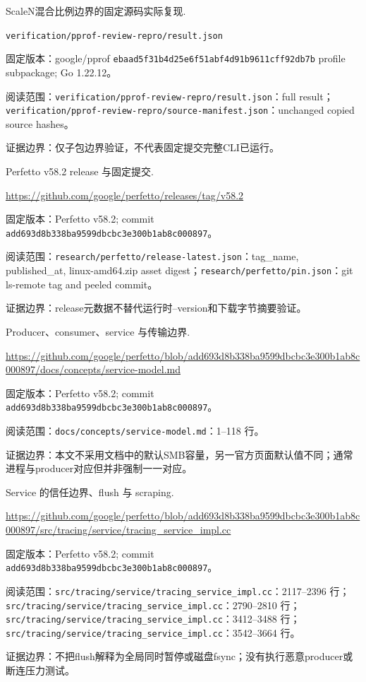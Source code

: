 \documentclass[UTF8,fontset=fandol,openany,11pt]{ctexbook}
\begin{document}
\begin{thebibliography}{999}
 ScaleN混合比例边界的固定源码实际复现.\par
\nolinkurl{verification/pprof-review-repro/result.json}\par
{\small\raggedright 固定版本：google/pprof \texttt{ebaad5f3\allowbreak{}1b4d25e6\allowbreak{}f51abf4d\allowbreak{}91b9611c\allowbreak{}ff92db7b} profile subpackage; Go 1.22.12。\par
阅读范围：\nolinkurl{verification/pprof-review-repro/result.json}：full result；\nolinkurl{verification/pprof-review-repro/source-manifest.json}：unchanged copied source hashes。\par
证据边界：仅子包边界验证，不代表固定提交完整CLI已运行。
}

 Perfetto v58.2 release 与固定提交.\par
\url{https://github.com/google/perfetto/releases/tag/v58.2}\par
{\small\raggedright 固定版本：Perfetto v58.2; commit \texttt{add693d8\allowbreak{}b338ba95\allowbreak{}99dbcbc3\allowbreak{}e300b1ab\allowbreak{}8c000897}。\par
阅读范围：\nolinkurl{research/perfetto/release-latest.json}：tag\_name, published\_at, linux-amd64.zip asset digest；\nolinkurl{research/perfetto/pin.json}：git ls-remote tag and peeled commit。\par
证据边界：release元数据不替代运行时--version和下载字节摘要验证。
}

 Producer、consumer、service 与传输边界.\par
\url{https://github.com/google/perfetto/blob/add693d8b338ba9599dbcbc3e300b1ab8c000897/docs/concepts/service-model.md}\par
{\small\raggedright 固定版本：Perfetto v58.2; commit \texttt{add693d8\allowbreak{}b338ba95\allowbreak{}99dbcbc3\allowbreak{}e300b1ab\allowbreak{}8c000897}。\par
阅读范围：\nolinkurl{docs/concepts/service-model.md}：1–118 行。\par
证据边界：本文不采用文档中的默认SMB容量，另一官方页面默认值不同；通常进程与producer对应但并非强制一一对应。
}

 Service 的信任边界、flush 与 scraping.\par
\url{https://github.com/google/perfetto/blob/add693d8b338ba9599dbcbc3e300b1ab8c000897/src/tracing/service/tracing_service_impl.cc}\par
{\small\raggedright 固定版本：Perfetto v58.2; commit \texttt{add693d8\allowbreak{}b338ba95\allowbreak{}99dbcbc3\allowbreak{}e300b1ab\allowbreak{}8c000897}。\par
阅读范围：\nolinkurl{src/tracing/service/tracing_service_impl.cc}：2117–2396 行；\nolinkurl{src/tracing/service/tracing_service_impl.cc}：2790–2810 行；\nolinkurl{src/tracing/service/tracing_service_impl.cc}：3412–3488 行；\nolinkurl{src/tracing/service/tracing_service_impl.cc}：3542–3664 行。\par
证据边界：不把flush解释为全局同时暂停或磁盘fsync；没有执行恶意producer或断连压力测试。
}


\end{thebibliography}
\end{document}
